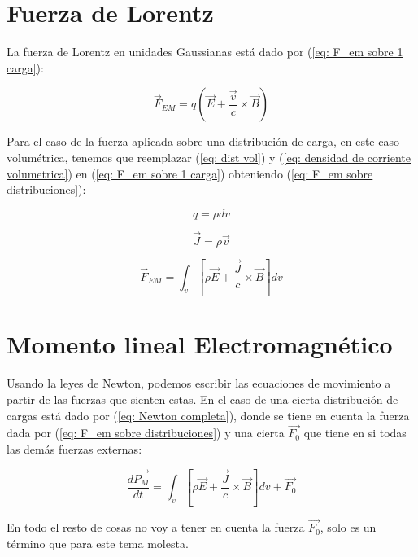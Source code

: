 \documentclass[]{article}
\begin{document}
\section*{Fuerza de Lorentz}
La fuerza de Lorentz en unidades Gaussianas está dado por (\ref{eq: F_em sobre 1 carga}):

\begin{equation}
    \vec{F}_{EM} = q \left(\vec{E} + \frac{\vec{v}}{c} \times \vec{B}\right)
    \label{eq: F_em sobre 1 carga}
\end{equation}

Para el caso de la fuerza aplicada sobre una distribución de carga, en este 
caso volumétrica, tenemos que reemplazar (\ref{eq: dist vol}) y (\ref{eq: densidad de corriente volumetrica})
en (\ref{eq: F_em sobre 1 carga}) obteniendo (\ref{eq: F_em sobre distribuciones}):

\begin{equation}
    q = \rho dv
    \label{eq: dist vol}
\end{equation}

\begin{equation}
    \vec{J} = \rho \vec{v}
    \label{eq: densidad de corriente volumetrica}
\end{equation}

\begin{equation}
    \vec{F}_{EM} = \int_{v}^{} [\rho \vec{E} + \frac{\vec{J}}{c} \times \vec{B}] dv
    \label{eq: F_em sobre distribuciones}
\end{equation}


\section*{Momento lineal Electromagnético}

Usando la leyes de Newton, podemos escribir las ecuaciones de movimiento a partir de las fuerzas
que sienten estas. En el caso de una cierta distribución de cargas está dado por (\ref{eq: Newton completa}),
donde se tiene en cuenta la fuerza dada por (\ref{eq: F_em sobre distribuciones}) y una cierta
$\vec{F_0}$ que tiene en si todas las demás fuerzas externas:

\begin{equation}
    \frac{d\vec{P_{M}}}{dt} = \int_{v}^{} [\rho \vec{E} + \frac{\vec{J}}{c} \times \vec{B}] dv + \vec{F_0}
    \label{eq: Newton completa}
\end{equation}

En todo el resto de cosas no voy a tener en cuenta la fuerza $\vec{F_0}$, solo es un término que para este
tema molesta.
\end{document}
